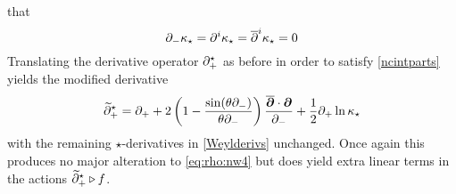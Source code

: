 that
\begin{equation}
  \label{eq:weyl:mu}
  \partial_-\kappa_\star=\partial^i\kappa_\star=\overline{\partial}^{ i}\kappa_\star=0
\end{equation}
Translating the derivative operator $\partial_+^\star$ as before in order to satisfy
\eqref{ncintparts} yields the modified derivative
\begin{equation}
  \label{eq:weyl:d}
  \widetilde{\partial}^{ \star}_+=\partial_++2 
  \left(1-\frac{\sin(\theta \partial_-)}{\theta \partial_-}
  \right) \frac{\overline{{{\boldsymbol {\partial} }}}\cdot{{\boldsymbol {\partial} }}}{\partial_-}+
  \frac12 \partial_+\ln\kappa_\star
\end{equation}
with the remaining $\star$-derivatives in \eqref{Weylderivs} unchanged. Once
again this produces no major alteration to \eqref{eq:rho:nw4} but does yield
extra linear terms in the actions $\widetilde{\partial}^{ \star}_+\triangleright f$.

